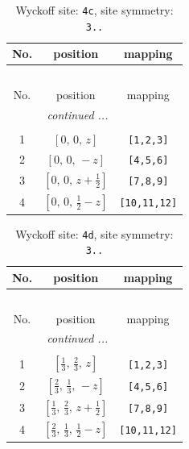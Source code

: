 \documentclass[fleqn,8pt]{jsarticle}
\begin{document}
\renewcommand{\arraystretch}{1.2}
\begin{longtable}{ccc}
\caption{Wyckoff site: {\tt 4c}, site symmetry: {\tt 3..}}
 \\
 \hline \hline
No. & position & mapping \\ \hline \endfirsthead

\multicolumn{2}{l}{\tablename\ \thetable{}} \\
 \hline \hline
No. & position & mapping \\ \hline \endhead

 \hline \hline
\multicolumn{2}{r}{\footnotesize\it continued ...} \\ \endfoot

 \hline \hline
\multicolumn{2}{r}{} \\ \endlastfoot

1 & $\left[ 0,\, 0,\, z \right]$ & {\tt [1,2,3]} \\ \hline
2 & $\left[ 0,\, 0,\, - z \right]$ & {\tt [4,5,6]} \\ \hline
3 & $\left[ 0,\, 0,\, z + \frac{1}{2} \right]$ & {\tt [7,8,9]} \\ \hline
4 & $\left[ 0,\, 0,\, \frac{1}{2} - z \right]$ & {\tt [10,11,12]} \\
\end{longtable}
\renewcommand{\arraystretch}{1.2}
\begin{longtable}{ccc}
\caption{Wyckoff site: {\tt 4d}, site symmetry: {\tt 3..}}
 \\
 \hline \hline
No. & position & mapping \\ \hline \endfirsthead

\multicolumn{2}{l}{\tablename\ \thetable{}} \\
 \hline \hline
No. & position & mapping \\ \hline \endhead

 \hline \hline
\multicolumn{2}{r}{\footnotesize\it continued ...} \\ \endfoot

 \hline \hline
\multicolumn{2}{r}{} \\ \endlastfoot

1 & $\left[ \frac{1}{3},\, \frac{2}{3},\, z \right]$ & {\tt [1,2,3]} \\ \hline
2 & $\left[ \frac{2}{3},\, \frac{1}{3},\, - z \right]$ & {\tt [4,5,6]} \\ \hline
3 & $\left[ \frac{1}{3},\, \frac{2}{3},\, z + \frac{1}{2} \right]$ & {\tt [7,8,9]} \\ \hline
4 & $\left[ \frac{2}{3},\, \frac{1}{3},\, \frac{1}{2} - z \right]$ & {\tt [10,11,12]} \\
\end{longtable}
\end{document}
